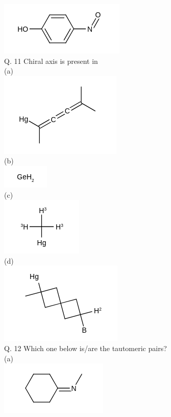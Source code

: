 \documentclass[10pt]{article}
\begin{document}
\includegraphics{smile-13308ae70c0788bdf66de8340b2937ff69c06002}\\
Q. 11 Chiral axis is present in\\
(a)\\
\includegraphics{smile-179febe824d45f7831f57c0992c5301850ba3df4}\\
(b)\\
\includegraphics{smile-b93a2b794e6c927eeae6a6d629f2278f66c4be66}\\
(c)\\
\includegraphics{smile-238e4c61f9905ab5f31d11b33a9a6fcfcad7fc78}\\
(d)\\
\includegraphics{smile-5dcecbb5bffd786cb897e533177c8c5d07705b7b}\\
Q. 12 Which one below is/are the tautomeric pairs?\\
(a)\\
\includegraphics{smile-3e2f75e7db31bbf421c6a15d0c2f83ee0dfce917}\\
\end{document}
